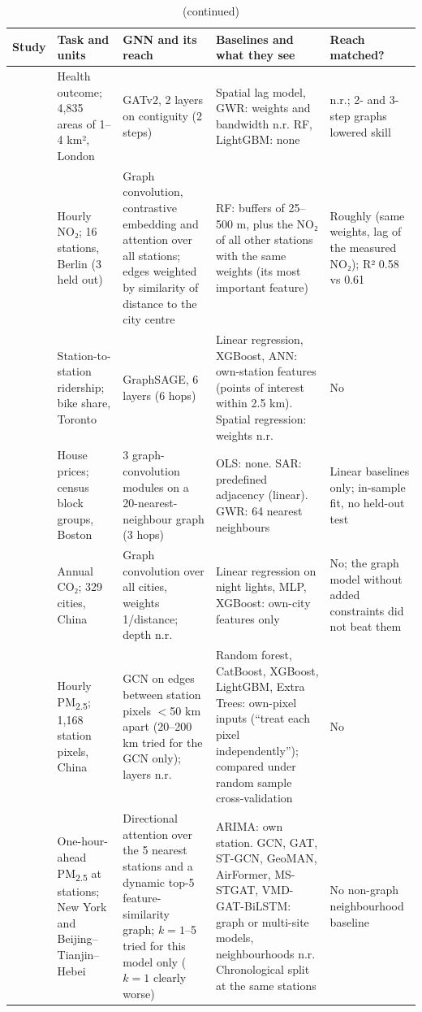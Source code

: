 \documentclass[pdflatex,sn-basic]{sn-jnl}
\begin{document}
\begin{table}[!htbp]
\addtocounter{table}{-1}
\caption{(continued)}
\footnotesize
\setlength{\tabcolsep}{4pt}
\begin{tabularx}{\textwidth}{@{}Y{0.76}Y{0.8}Y{1.06}Y{1.28}Y{1.1}@{}}
\toprule
Study & Task and units & GNN and its reach & Baselines and what they see & Reach matched? \\
\midrule
\citet{zhao2026} & Health outcome; 4,835 areas of 1--4 km², London & GATv2, 2 layers on contiguity (2 steps) & Spatial lag model, GWR: weights and bandwidth n.r. RF, LightGBM: none & n.r.; 2- and 3-step graphs lowered skill \\
\citet{schmidt2026} & Hourly NO₂; 16 stations, Berlin (3 held out) & Graph convolution, contrastive embedding and attention over all stations; edges weighted by similarity of distance to the city centre & RF: buffers of 25--500 m, plus the NO₂ of all other stations with the same weights (its most important feature) & Roughly (same weights, lag of the measured NO₂); R² 0.58 vs 0.61 \\
\citet{mohseni2026} & Station-to-station ridership; bike share, Toronto & GraphSAGE, 6 layers (6 hops) & Linear regression, XGBoost, ANN: own-station features (points of interest within 2.5 km). Spatial regression: weights n.r. & No \\
\citet{zhu2026} & House prices; census block groups, Boston & 3 graph-convolution modules on a 20-nearest-neighbour graph (3 hops) & OLS: none. SAR: predefined adjacency (linear). GWR: 64 nearest neighbours & Linear baselines only; in-sample fit, no held-out test \\
\citet{shao2026} & Annual CO₂; 329 cities, China & Graph convolution over all cities, weights 1/distance; depth n.r. & Linear regression on night lights, MLP, XGBoost: own-city features only & No; the graph model without added constraints did not beat them \\
\citet{teng2026} & Hourly PM\textsubscript{2.5}; 1,168 station pixels, China & GCN on edges between station pixels $<$50 km apart (20--200 km tried for the GCN only); layers n.r. & Random forest, CatBoost, XGBoost, LightGBM, Extra Trees: own-pixel inputs (``treat each pixel independently''); compared under random sample cross-validation & No \\
\citet{yuan2026} & One-hour-ahead PM\textsubscript{2.5} at stations; New York and Beijing--Tianjin--Hebei & Directional attention over the 5 nearest stations and a dynamic top-5 feature-similarity graph; $k = 1$--5 tried for this model only ($k = 1$ clearly worse) & ARIMA: own station. GCN, GAT, ST-GCN, GeoMAN, AirFormer, MS-STGAT, VMD-GAT-BiLSTM: graph or multi-site models, neighbourhoods n.r. Chronological split at the same stations & No non-graph neighbourhood baseline \\

\end{tabularx}
\end{table}
\end{document}

